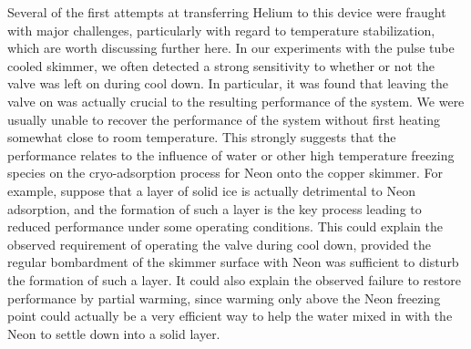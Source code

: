 Several of the first attempts at transferring Helium to this device were fraught with major challenges, particularly with regard to temperature stabilization, which are worth discussing further here.
In our experiments with the pulse tube cooled skimmer, we often detected a strong sensitivity to whether or not the valve was left on during cool down.
In particular, it was found that leaving the valve on was actually crucial to the resulting performance of the system.
We were usually unable to recover the performance of the system without first heating somewhat close to room temperature.
This strongly suggests that the performance relates to the influence of water or other high temperature freezing species on the cryo-adsorption process for Neon onto the copper skimmer.
For example, suppose that a layer of solid ice is actually detrimental to Neon adsorption, and the formation of such a layer is the key process leading to reduced performance under some operating conditions.
This could explain the observed requirement of operating the valve during cool down, provided the regular bombardment of the skimmer surface with Neon was sufficient to disturb the formation of such a layer.
It could also explain the observed failure to restore performance by partial warming, since warming only above the Neon freezing point could actually be a very efficient way to help the water mixed in with the Neon to settle down into a solid layer.


